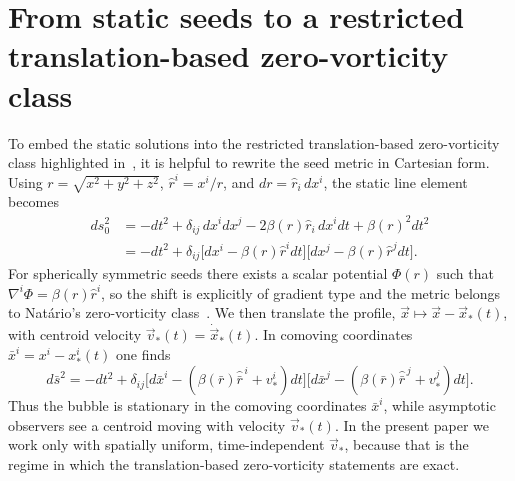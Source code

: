 \documentclass[11pt]{article}
\begin{document}
\section{From static seeds to a restricted translation-based zero-vorticity class}
\label{sec:warp}
To embed the static solutions into the restricted translation-based zero-vorticity class highlighted in~\cite{Santiago:2021aup,Schuster:2023ADMmass}, it is helpful to rewrite the seed metric in Cartesian form. Using $r=\sqrt{x^2+y^2+z^2}$, $\hat r^i=x^i/r$, and $dr=\hat r_i\,dx^i$, the static line element becomes
\begin{equation}
\label{eq:zero-vorticity-line-revised}
\begin{aligned}
ds_0^2
&=-dt^2+\delta_{ij}\,dx^i dx^j-2\beta(r)\hat r_i\,dx^i dt+\beta(r)^2dt^2\\
&=-dt^2+\delta_{ij}\bigl[dx^i-\beta(r)\hat r^i dt\bigr]\bigl[dx^j-\beta(r)\hat r^j dt\bigr].
\end{aligned}
\end{equation}
For spherically symmetric seeds there exists a scalar potential $\Phi(r)$ such that $\nabla^i\Phi=\beta(r)\hat r^i$, so the shift is explicitly of gradient type and the metric belongs to Nat\'ario's zero-vorticity class~\cite{Natario:2001,Schuster:2023ADMmass}. We then translate the profile, $\vec x\mapsto \vec x-\vec x_*(t)$, with centroid velocity $\vec v_*(t)=\dot{\vec x}_*(t)$. In comoving coordinates $\bar x^i=x^i-x_*^i(t)$ one finds
\begin{equation}
\label{eq:comoving-revised}
d\bar s^2=-dt^2+\delta_{ij}\Big[d\bar x^i-(\beta(\bar r)\hat{\bar r}^{\,i}+v_*^i)dt\Big]\Big[d\bar x^j-(\beta(\bar r)\hat{\bar r}^{\,j}+v_*^j)dt\Big].
\end{equation}
Thus the bubble is stationary in the comoving coordinates $\bar x^i$, while asymptotic observers see a centroid moving with velocity $\vec v_*(t)$. In the present paper we work only with spatially uniform, time-independent $\vec v_*$, because that is the regime in which the translation-based zero-vorticity statements are exact.
\end{document}
